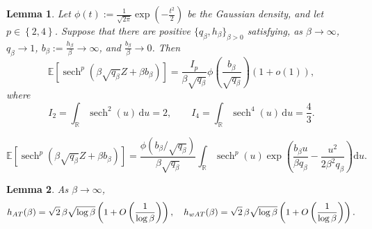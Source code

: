 \documentclass[10pt,a4paper]{amsart}
\newtheorem{lemma}{Lemma}
\newcommand{\Brace}[1]{\left\{#1\right\}}
\newcommand{\Brack}[1]{\left[#1\right]}
\newcommand{\Par}[1]{\left(#1\right)}
\newcommand{\R}{\mathbb{R}}
\newcommand{\bbE}{{\mathbb{E}}}
\newcommand{\defeq}{:=}
\begin{document}
\begin{lemma}
    \label{lem:sech_laplace}
    Let \( \phi(t) \defeq \frac{1}{\sqrt{2\pi}} \exp(-\frac{t^2}{2})\) be the Gaussian density, and let $p\in\Brace{2,4}$. Suppose that there are positive $\{q_\beta, h_\beta\}_{\beta > 0}$ satisfying, as $\beta \to \infty$,
    $q_\beta\to1$, $b_\beta \defeq \frac{h_\beta} \beta \to\infty$, and
    $\frac{b_\beta} \beta\to0$. Then
    \begin{equation}
        \label{eq:sech_laplace}
        \bbE\Brack{
            \operatorname{sech}^p
            \Par{
                \beta\sqrt{q_\beta}Z+\beta b_\beta
            }
        }
        =
        \frac{
            I_p
        }{
            \beta\sqrt{q_\beta}
        }
        \phi\Par{
            \frac{
                b_\beta
            }{
                \sqrt{q_\beta}
            }
        }
        \Par{1+o(1)},
    \end{equation}
    where
    \[
        I_2
        =
        \int_{\R}\operatorname{sech}^2(u)\,\mathrm du
        =
        2,
        \qquad
        I_4
        =
        \int_{\R}\operatorname{sech}^4(u)\,\mathrm du
        =
        \frac{4}{3}.
    \]
\end{lemma}

\begin{equation}\label{eq:cov_integral}
    \bbE\Brack{
        \operatorname{sech}^p
        \Par{
            \beta\sqrt{q_\beta}Z+\beta b_\beta
        }
    }
    =
    \frac{
        \phi\Par{b_\beta/\sqrt{q_\beta}}
    }{
        \beta\sqrt{q_\beta}
    }
    \int_{\R}
    \operatorname{sech}^p(u)
    \exp\Par{
        \frac{
            b_\beta u
        }{
            \beta q_\beta
        }
        -
        \frac{
            u^2
        }{
            2\beta^2q_\beta
        }
    }
    \mathrm du.
\end{equation}

\begin{lemma}
    \label{lem:at_line}
    As $\beta\to\infty$,
    \[
        h_{\rm AT}(\beta)
        =
        \sqrt{2}\,\beta\sqrt{\log\beta}
        \Par{1+O\Par{\frac{1}{\log\beta}}},
        \quad
        h_{\rm wAT}(\beta)
        =
        \sqrt{2}\,\beta\sqrt{\log\beta}
        \Par{1+O\Par{\frac{1}{\log\beta}}}.
    \]
\end{lemma}
\end{document}
